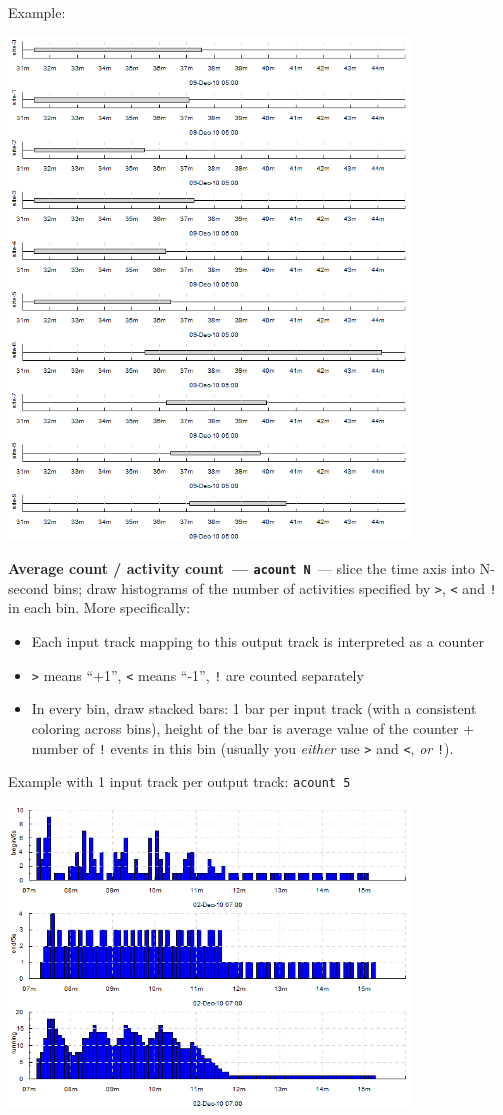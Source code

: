 \documentclass{article}
\begin{document}
Example:

\centerline{\includegraphics[width=0.8\textwidth]{pics/tplot/event.png}}

\pagebreak
\noindent
\textbf{Average count / activity count~--- \texttt{acount N}}~--- slice the time axis into N-second bins; draw histograms of the number of activities specified by \texttt{>}, \texttt{<} and \texttt{!} in each bin. More specifically:
\begin{itemize}
 \item Each input track mapping to this output track is interpreted as a counter
 \item \texttt{>} means ``+1'', \texttt{<} means ``-1'', \texttt{!} are counted separately
 \item In every bin, draw stacked bars: 1 bar per input track (with a consistent coloring across bins), height of the bar is average value of the counter + number of \texttt{!} events in this bin (usually you \emph{either} use \texttt{>} and \texttt{<}, \emph{or} \texttt{!}).
\end{itemize}

Example with 1 input track per output track: \texttt{acount 5}

\centerline{\includegraphics[width=0.8\textwidth]{pics/tplot/acount-begin-end-running.png}}
\end{document}
